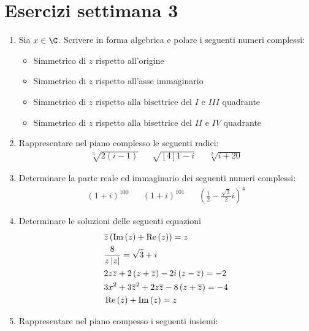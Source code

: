 \section{Esercizi settimana 3}
\begin{enumerate}
	\item Sia $ x \in  \C  $. Scrivere in forma algebrica e polare i seguenti numeri complessi:
	      \begin{itemize}
		      \item Simmetrico di $ z $ rispetto all'origine
		      \item Simmetrico di $ z $ rispetto all'asse immaginario
		      \item Simmetrico di $ z $ rispetto alla bisettrice del $ I $ e $ III $ quadrante
		      \item Simmetrico di $ z $ rispetto alla bisettrice del $ II $ e $ IV $ quadrante
	      \end{itemize}
	\item Rappresentare nel piano complesso le seguenti radici:
	      \begin{align*}
		      \sqrt[3]{2\left(i-1\right)} &  & \sqrt{[4]1 -i} &  & \sqrt[2]{i + 20}
	      \end{align*}
	\item Determinare la parte reale ed immaginario dei seguenti numeri complessi:
	      \begin{align*}
		      \left(1 + i\right)^{100} &  & \left(1 + i \right)^{ 101} &  & \left(\frac{1}{2} - \frac{\sqrt{3}}{2}i\right)^{4}
	      \end{align*}
	\item Determinare le soluzioni delle seguenti equazioni
	      \begin{align*}
		       & \overline{z} \left(\operatorname{Im} \left(z\right) + \operatorname{Re}  \left(z\right)\right) = z                   \\
		       & \frac{8}{z \left|z\right|} = \sqrt{3} + i                                                \\
		       & 2z \overline{z} + 2\left(z + \overline{z}\right) - 2i \left(z - \overline{z}\right) = -2 \\
		       & 3 x^2  + 3 \overline{z}^2  + 2 z \overline{z} - 8 \left(z + \overline{z}\right) =  -4    \\
		       & \operatorname{Re}  \left(z\right) + \operatorname{Im} \left(z\right) = z
	      \end{align*}
	\item Rappresentare nel piano compesso i seguenti insiemi:
	      \begin{align*}

\end{align*}
\end{enumerate}
